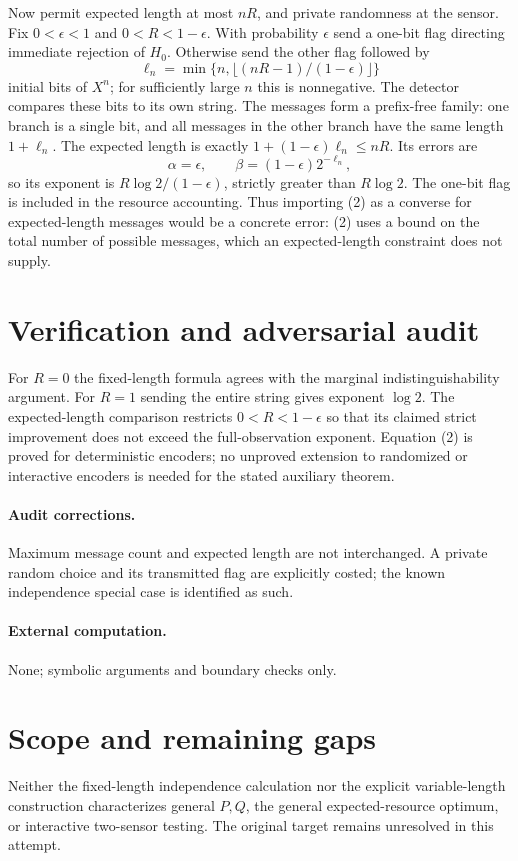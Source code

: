 \documentclass[11pt]{article}
\begin{document}
Now permit expected length at most $nR$, and private randomness at the sensor. Fix $0<\epsilon<1$ and $0<R<1-\epsilon$. With probability $\epsilon$ send a one-bit flag directing immediate rejection of $H_0$. Otherwise send the other flag followed by
\[
 \ell_n=\min\{n,\lfloor(nR-1)/(1-\epsilon)\rfloor\}
\]
initial bits of $X^n$; for sufficiently large $n$ this is nonnegative. The detector compares these bits to its own string. The messages form a prefix-free family: one branch is a single bit, and all messages in the other branch have the same length $1+\ell_n$. The expected length is exactly $1+(1-\epsilon)\ell_n\leq nR$. Its errors are
\[
 \alpha=\epsilon,\qquad \beta=(1-\epsilon)2^{-\ell_n},
\]
so its exponent is $R\log2/(1-\epsilon)$, strictly greater than $R\log2$. The one-bit flag is included in the resource accounting. Thus importing (2) as a converse for expected-length messages would be a concrete error: (2) uses a bound on the total number of possible messages, which an expected-length constraint does not supply.
\section{Verification and adversarial audit}
For $R=0$ the fixed-length formula agrees with the marginal indistinguishability argument. For $R=1$ sending the entire string gives exponent $\log2$. The expected-length comparison restricts $0<R<1-\epsilon$ so that its claimed strict improvement does not exceed the full-observation exponent. Equation (2) is proved for deterministic encoders; no unproved extension to randomized or interactive encoders is needed for the stated auxiliary theorem.
\paragraph{Audit corrections.} Maximum message count and expected length are not interchanged. A private random choice and its transmitted flag are explicitly costed; the known independence special case is identified as such.
\paragraph{External computation.} None; symbolic arguments and boundary checks only.
\section{Scope and remaining gaps}
Neither the fixed-length independence calculation nor the explicit variable-length construction characterizes general $P,Q$, the general expected-resource optimum, or interactive two-sensor testing. The original target remains unresolved in this attempt.
\end{document}
